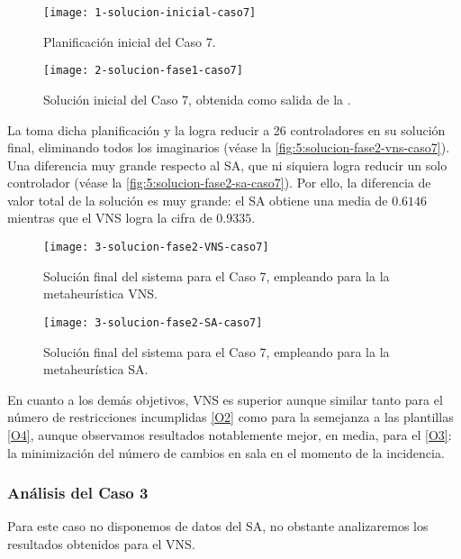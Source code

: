\begin{figure}
	\centering
	\texttt{[image: 1-solucion-inicial-caso7]}
	\caption{Planificación inicial del Caso 7.}
	\label{fig:5:solucion-inicial-caso7}
\end{figure}

\begin{figure}
	\centering
	\texttt{[image: 2-solucion-fase1-caso7]}
	\caption{Solución inicial del Caso 7, obtenida como salida de la \faseuno{}.}
	\label{fig:5:solucion-fase1-caso7}
\end{figure}

La \fasedos{} toma dicha planificación y la logra reducir a 26 controladores en su solución final, eliminando todos los imaginarios (véase la \autoref{fig:5:solucion-fase2-vns-caso7}). Una diferencia muy grande respecto al SA, que ni siquiera logra reducir un solo controlador (véase la \autoref{fig:5:solucion-fase2-sa-caso7}). Por ello, la diferencia de valor total de la solución es muy grande: el SA obtiene una media de $0.6146$ mientras que el VNS logra la cifra de $0.9335$.

\begin{figure}
	\centering
	\texttt{[image: 3-solucion-fase2-VNS-caso7]}
	\caption{Solución final del sistema para el Caso 7, empleando para la \fasedos{} la metaheurística VNS.}
	\label{fig:5:solucion-fase2-vns-caso7}
\end{figure}

\begin{figure}
	\centering
	\texttt{[image: 3-solucion-fase2-SA-caso7]}
	\caption{Solución final del sistema para el Caso 7, empleando para la \fasedos{} la metaheurística SA.}
	\label{fig:5:solucion-fase2-sa-caso7}
\end{figure}

En cuanto a los demás objetivos, VNS es superior aunque similar tanto para el número de restricciones incumplidas \ref{O2} como para la semejanza a las plantillas \ref{O4}, aunque observamos resultados notablemente mejor, en media, para el \ref{O3}: la minimización del número de cambios en sala en el momento de la incidencia.

\subsubsection{Análisis del Caso 3}

Para este caso no disponemos de datos del SA, no obstante analizaremos los resultados obtenidos para el VNS.

